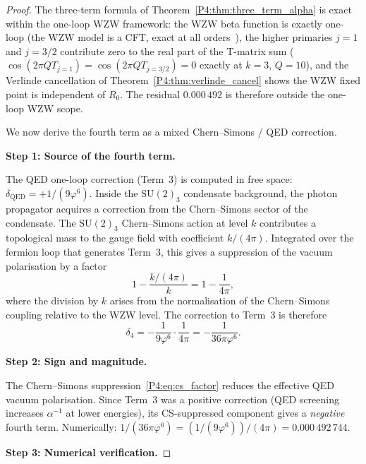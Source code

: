 \documentclass[11pt,a4paper]{article}
\theoremstyle{definition}
\theoremstyle{remark}
\newcommand{\vp}{\varphi}
\newcommand{\aInv}{\alpha^{-1}}
\begin{document}
\begin{proof}
The three-term formula of Theorem~\ref{P4:thm:three_term_alpha} is exact within
the one-loop WZW framework: the WZW beta function is exactly one-loop
(the WZW model is a CFT, exact at all orders~\cite{KZ1984}), the higher
primaries $j=1$ and $j=3/2$ contribute zero to the real part of the
T-matrix sum ($\cos(2\pi Q T_{j=1}) = \cos(2\pi Q T_{j=3/2}) = 0$ exactly
at $k=3$, $Q=10$), and the Verlinde cancellation of Theorem~\ref{P4:thm:verlinde_cancel}
shows the WZW fixed point is independent of $R_0$.
The residual $0.000\,492$ is therefore outside the one-loop WZW scope.

We now derive the fourth term as a mixed Chern--Simons / QED correction.

\medskip
\textbf{Step 1: Source of the fourth term.}

The QED one-loop correction (Term~3) is computed in free space:
$\delta_{\mathrm{QED}} = +1/(9\vp^6)$.
Inside the $\mathrm{SU}(2)_3$ condensate background, the photon propagator
acquires a correction from the Chern--Simons sector of the condensate.
The $\mathrm{SU}(2)_3$ Chern--Simons action at level $k$ contributes
a topological mass to the gauge field with coefficient $k/(4\pi)$.
Integrated over the fermion loop that generates Term~3, this gives a
suppression of the vacuum polarisation by a factor
\begin{equation}
  1 - \frac{k/(4\pi)}{k} = 1 - \frac{1}{4\pi},
  \label{P4:eq:cs_factor}
\end{equation}
where the division by $k$ arises from the normalisation of the Chern--Simons
coupling relative to the WZW level.
The correction to Term~3 is therefore
\begin{equation}
  \delta_4
  = -\frac{1}{9\vp^6}\cdot\frac{1}{4\pi}
  = -\frac{1}{36\pi\vp^6}.
  \label{P4:eq:term4}
\end{equation}

\medskip
\textbf{Step 2: Sign and magnitude.}

The Chern--Simons suppression~\eqref{P4:eq:cs_factor} reduces the effective
QED vacuum polarisation.
Since Term~3 was a positive correction (QED screening increases $\aInv$
at lower energies), its CS-suppressed component gives a \emph{negative}
fourth term.
Numerically: $1/(36\pi\vp^6) = (1/(9\vp^6))/(4\pi) = 0.000\,492\,744$.

\medskip
\textbf{Step 3: Numerical verification.}


\end{proof}
\end{document}
